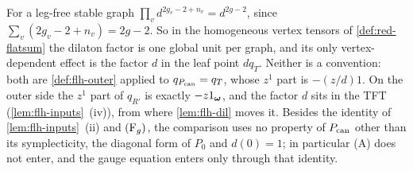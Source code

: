 \begin{rmk}
\label{rmk:flh-dilfactor}
For a leg-free stable graph $\prod_vd^{2g_v-2+n_v}=d^{2g-2}$, since $\sum_v(2g_v-2+n_v)=2g-2$. So in the homogeneous vertex tensors of \cref{def:red-flatsum} the dilaton factor is one global unit per graph, and its only vertex-dependent effect is the factor $d$ in the leaf point $dq_T$. Neither is a convention: both are \cref{def:flh-outer} applied to $q_{P_{\mathrm{can}}}=q_T$, whose $z^1$ part is $-(z/d)1$. On the outer side the $z^1$ part of $q_{R'}$ is exactly $-z1_{\boldsymbol{\omega}}$, and the factor $d$ sits in the TFT (\cref{lem:flh-inputs}~(iv)), from where \cref{lem:flh-dil} moves it. Besides the identity of \cref{lem:flh-inputs}~(ii) and $(\mathrm{F}_{g})$, the comparison uses no property of $P_{\mathrm{can}}$ other than its symplecticity, the diagonal form of $P_0$ and $d(0)=1$; in particular (A) does not enter, and the gauge equation enters only through that identity.
\end{rmk}
